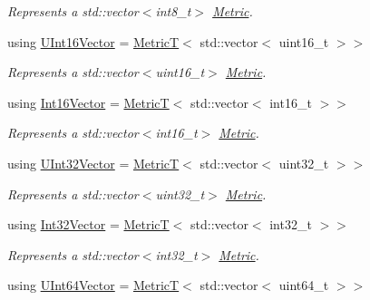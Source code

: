 \begin{DoxyCompactItemize}
\begin{DoxyCompactList}\small\item\em Represents a {\ttfamily std\+::vector$<$int8\+\_\+t$>$} \hyperlink{classdg_1_1deepcore_1_1_metric}{Metric}. \end{DoxyCompactList}\item 
using \hyperlink{group___process_metrics_ga188c9966929f876ed38fceadf000c0cd}{U\+Int16\+Vector} = \hyperlink{structdg_1_1deepcore_1_1_metric_t}{MetricT}$<$ std\+::vector$<$ uint16\+\_\+t $>$$>$
\begin{DoxyCompactList}\small\item\em Represents a {\ttfamily std\+::vector$<$uint16\+\_\+t$>$} \hyperlink{classdg_1_1deepcore_1_1_metric}{Metric}. \end{DoxyCompactList}\item 
using \hyperlink{group___process_metrics_ga657cf9643cfa30f7616a44f6d240966c}{Int16\+Vector} = \hyperlink{structdg_1_1deepcore_1_1_metric_t}{MetricT}$<$ std\+::vector$<$ int16\+\_\+t $>$$>$
\begin{DoxyCompactList}\small\item\em Represents a {\ttfamily std\+::vector$<$int16\+\_\+t$>$} \hyperlink{classdg_1_1deepcore_1_1_metric}{Metric}. \end{DoxyCompactList}\item 
using \hyperlink{group___process_metrics_ga6149d91758b5b2efea24946ce8017e00}{U\+Int32\+Vector} = \hyperlink{structdg_1_1deepcore_1_1_metric_t}{MetricT}$<$ std\+::vector$<$ uint32\+\_\+t $>$$>$
\begin{DoxyCompactList}\small\item\em Represents a {\ttfamily std\+::vector$<$uint32\+\_\+t$>$} \hyperlink{classdg_1_1deepcore_1_1_metric}{Metric}. \end{DoxyCompactList}\item 
using \hyperlink{group___process_metrics_gad3e39491733d99cfde41c0cb422cd8a8}{Int32\+Vector} = \hyperlink{structdg_1_1deepcore_1_1_metric_t}{MetricT}$<$ std\+::vector$<$ int32\+\_\+t $>$$>$
\begin{DoxyCompactList}\small\item\em Represents a {\ttfamily std\+::vector$<$int32\+\_\+t$>$} \hyperlink{classdg_1_1deepcore_1_1_metric}{Metric}. \end{DoxyCompactList}\item 
using \hyperlink{group___process_metrics_gab60bfff8e0160f83141f8685fc56c2a2}{U\+Int64\+Vector} = \hyperlink{structdg_1_1deepcore_1_1_metric_t}{MetricT}$<$ std\+::vector$<$ uint64\+\_\+t $>$$>$
$$
\end{DoxyCompactItemize}

